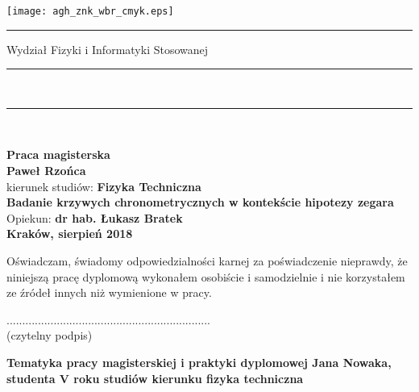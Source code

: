 \pagestyle{empty}
\texttt{[image: agh\_znk\_wbr\_cmyk.eps]}\\
\rule{30mm}{0pt}
{\large\textsf{Wydział Fizyki i Informatyki Stosowanej}}\\
\rule{\textwidth}{3pt}\\
\rule[2ex]
{\textwidth}{1pt}\\
\vspace{7ex}
\begin{center}
{\bf\LARGE\textsf{Praca magisterska}}\\
\vspace{13ex}
{\bf\Large\textsf{Paweł Rzońca}}\\
\vspace{3ex}
{\sf \small kierunek studiów:} {\bf\small\textsf{Fizyka Techniczna}}\\
\vspace{15ex}
{\bf\huge\textsf{Badanie krzywych chronometrycznych w kontekście hipotezy zegara}}\\
\vspace{14ex}
{\sf \Large Opiekun:} {\bf\Large\textsf{dr hab. Łukasz Bratek}}\\
\vspace{22ex}
\textsf{\bf\large\textsf{Kraków, sierpień 2018}}
\end{center}
\newpage
{\sf Oświadczam, świadomy odpowiedzialności karnej za poświadczenie nieprawdy,
że niniejszą pracę dyplomową wykonałem osobiście i samodzielnie i nie korzystałem
ze źródeł innych niż wymienione w pracy.}

\vspace{14ex}

\begin{flushright}
................................................................. \\
{\sf (czytelny podpis)}
\end{flushright}
\newpage

\newpage
{}
\begin{center}
{\bf Tematyka pracy magisterskiej i praktyki dyplomowej
Jana Nowaka,
studenta V roku studiów kierunku fizyka techniczna}\\
\end{center}

